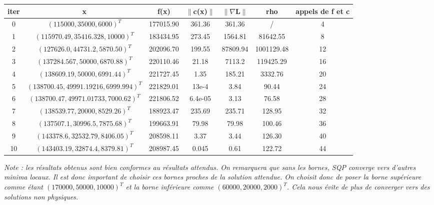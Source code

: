 {\renewcommand{\arraystretch}{1.5}
\begin{table}[h]\centering \small\begin{tabular}{|c|c|c|c|c|c|c|}
	\hline
 	iter & x & f(x) & $\| $c(x)$ \|$ & $\|    \nabla $L$  \|$ & rho & appels de f et c\\
	\hline
	0 & $(115000, 35000, 6000)^{T}$ & 177015.90 & 361.36 & 361.36 & / & 4\\
	\hline
	1 & $(115970.49, 35416.328, 10000)^{T}$ & 183434.95 & 273.45 & 1564.81 & 81642.55 & 8\\
	\hline
	2 & $(127626.0, 44731.2, 5870.50)^{T}$ & 202096.70 & 199.55 & 87809.94 & 1001129.48 & 12\\
	\hline
	3 & $(137284.567, 50000, 6870.88 )^{T}$ & 220110.46 & 21.18 & 7113.2 & 119425.29 & 16\\
	\hline
	4 & $(138609.19, 50000, 6991.44 )^{T}$ & 221727.45 & 1.35& 185.21 & 3332.76 & 20\\
	\hline
	5 & $(138700.45, 49991.19216, 6999.994 )^{T}$ & 221829.01 & 13e-4 & 3.84 & 90.44 & 24\\
	\hline
	6 & $(138700.47, 49971.01733, 7000.62 )^{T}$ & 221806.52 & 6.4e-05 & 3.13 & 76.58 & 28\\
	\hline
	7 & $(138539.77, 20000, 8529.26 )^{T}$ & 188923.47 & 235.69 &235.71 & 128.95 & 32\\
	\hline
	8 & $(137507.1, 30996.5, 7875.68)^{T}$ & 199663.91 &  79.98 & 79.98 & 100.46 & 36\\
	\hline
	9 & $(143378.6, 32532.79, 8406.05 )^{T}$ & 208598.11 & 3.37 & 3.44 & 126.30 & 40\\
	\hline
	10 & $(143403.19, 32874.4, 8379.81 )^{T}$ & 208987.45 & 0.045 & 0.61 & 122.72 & 44\\
	\hline
\end{tabular}
\end{table}}
\bigbreak
\textit{Note : les résultats obtenus sont bien conformes au résultats attendus. On remarquera que sans les bornes, SQP converge vers d'autres minima locaux. Il est donc important de choisir ces bornes proches de la solution attendue. On choisit donc de poser la borne supérieure comme étant $(170000 , 50000 , 10000)^{T}$ et la borne inférieure comme $(60000 , 20000 , 2000)^{T}$. Cela nous évite de plus de converger vers des solutions non physiques.}

